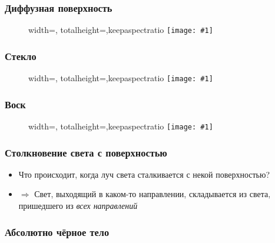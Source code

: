\documentclass[10pt]{beamer}
\newcommand{\slideimage}[1]{
  \begin{figure}
    \begin{adjustbox}{width=\textwidth, totalheight=\textheight-2\baselineskip-2\baselineskip,keepaspectratio}
      \texttt{[image: \#1]}
    \end{adjustbox}
  \end{figure}
}
\begin{document}

\begin{frame}[fragile]
\frametitle{Диффузная поверхность}
\slideimage{diffuse.png}
\end{frame}


\begin{frame}[fragile]
\frametitle{Стекло}
\slideimage{glass.png}
\end{frame}


\begin{frame}[fragile]
\frametitle{Воск}
\slideimage{wax.png}
\end{frame}

\begin{frame}[fragile]
\frametitle{Столкновение света с поверхностью}
\begin{itemize}
\item Что происходит, когда луч света сталкивается с некой поверхностью?
\pause
\item \begin{math}\Longrightarrow\end{math} Свет, выходящий в каком-то направлении, складывается из света, пришедшего из \textit{всех направлений}
\end{itemize}
\end{frame}

\begin{frame}[fragile]
\frametitle{Абсолютно чёрное тело}
\begin{center}
\end{center}
\end{frame}
\end{document}
